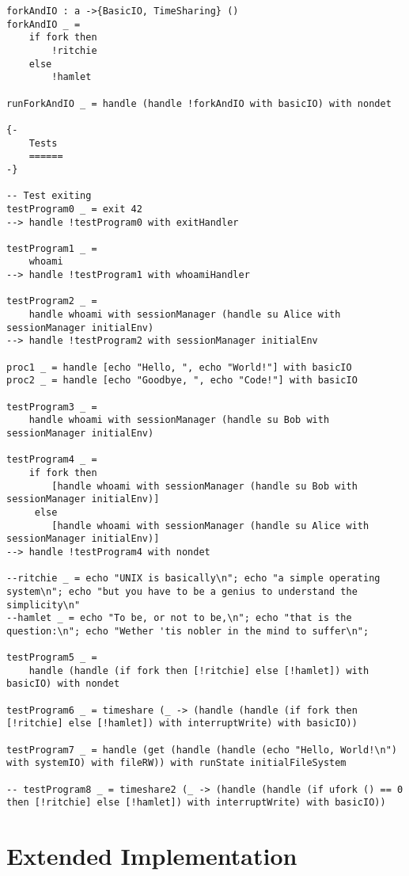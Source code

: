 \documentclass[logo,bsc,singlespacing,parskip]{infthesis}
\begin{document}
\begin{lstlisting}[language=unison]
forkAndIO : a ->{BasicIO, TimeSharing} ()
forkAndIO _ = 
    if fork then
        !ritchie
    else
        !hamlet

runForkAndIO _ = handle (handle !forkAndIO with basicIO) with nondet
        
{-
    Tests
    ======
-}

-- Test exiting
testProgram0 _ = exit 42
--> handle !testProgram0 with exitHandler

testProgram1 _ =
    whoami
--> handle !testProgram1 with whoamiHandler

testProgram2 _ =
    handle whoami with sessionManager (handle su Alice with sessionManager initialEnv)
--> handle !testProgram2 with sessionManager initialEnv

proc1 _ = handle [echo "Hello, ", echo "World!"] with basicIO
proc2 _ = handle [echo "Goodbye, ", echo "Code!"] with basicIO

testProgram3 _ =
    handle whoami with sessionManager (handle su Bob with sessionManager initialEnv)

testProgram4 _ =
    if fork then
        [handle whoami with sessionManager (handle su Bob with sessionManager initialEnv)]
     else
        [handle whoami with sessionManager (handle su Alice with sessionManager initialEnv)]
--> handle !testProgram4 with nondet

--ritchie _ = echo "UNIX is basically\n"; echo "a simple operating system\n"; echo "but you have to be a genius to understand the simplicity\n"
--hamlet _ = echo "To be, or not to be,\n"; echo "that is the question:\n"; echo "Wether 'tis nobler in the mind to suffer\n";

testProgram5 _ =
    handle (handle (if fork then [!ritchie] else [!hamlet]) with basicIO) with nondet

testProgram6 _ = timeshare (_ -> (handle (handle (if fork then [!ritchie] else [!hamlet]) with interruptWrite) with basicIO))

testProgram7 _ = handle (get (handle (handle (echo "Hello, World!\n") with systemIO) with fileRW)) with runState initialFileSystem

-- testProgram8 _ = timeshare2 (_ -> (handle (handle (if ufork () == 0 then [!ritchie] else [!hamlet]) with interruptWrite) with basicIO))
\end{lstlisting}

\section{Extended Implementation}
\end{document}
